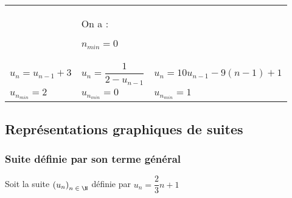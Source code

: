 \begin{tabular}{lll}
& 

\hspace*{-.3cm}

On a :

$n_{min} = 0$ \\

\hspace*{-1cm}

$u_n = u_{n-1} +3$ & 

\hspace*{.4cm}

$u_n = \dfrac{1}{2 - u_{n-1}}$ & 

\hspace*{.7cm}

$u_n = 10u_{n-1} - 9\left(n-1\right) + 1$  \\

\hspace*{-1cm}

$u_{n_{min}} = 2$ & 

\hspace*{.4cm}

$u_{n_{min}} = 0$ & 

\hspace*{.7cm}

$u_{n_{min}} = 1$ \\

\end{tabular}

\newpage

\subsection{Représentations graphiques de suites}

\subsubsection{Suite définie par son terme général}

Soit la suite $\left(u_n\right)_{n \; \in \; \N}$ définie par $u_n = \dfrac{2}{3}n + 1$ \\






